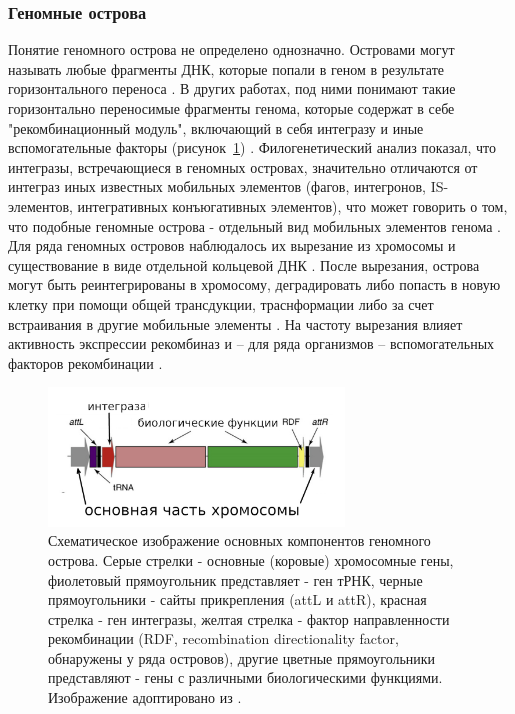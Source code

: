 


\subsubsection{Геномные острова}
Понятие геномного острова не определено однозначно. Островами могут называть любые фрагменты ДНК, которые попали в геном в результате горизонтального переноса \cite{langille2010detecting, bazin2020panrgp}. В других работах, под ними понимают такие горизонтально переносимые фрагменты генома, которые содержат в себе "рекомбинационный модуль", включающий в себя интегразу и иные вспомогательные факторы (рисунок~\ref{img:gi}) \cite{boyd2009genomic}. Филогенетический анализ показал, что интегразы, встречающиеся в геномных островах, значительно отличаются от интеграз иных известных мобильных элементов (фагов, интегронов, IS-элементов, интегративных конъюгативных элементов), что может говорить о том, что подобные геномные острова - отдельный вид мобильных элементов генома \cite{boyd2009genomic}. Для ряда геномных островов наблюдалось их вырезание из хромосомы и существование в виде отдельной кольцевой ДНК \cite{blum1994excision, rajanna2003vibrio}. После вырезания, острова могут быть реинтегрированы в хромосому, деградировать либо попасть в новую клетку при помощи общей трансдукции, траснформации либо за счет встраивания в другие мобильные элементы \cite{carpenter2016pathogenicity, pant2020molecular, boyd2009genomic}. На частоту вырезания влияет активность экспрессии рекомбиназ и -- для ряда организмов -- вспомогательных факторов рекомбинации \cite{pant2020molecular}.

\begin{figure}[!ht] 
  \center
  \includegraphics [width=0.7\textwidth] {Dissertation/images/lit/gi.jpg}
  \caption{Схематическое изображение основных компонентов геномного острова. Серые стрелки - основные (коровые) хромосомные гены, фиолетовый прямоугольник представляет - ген тРНК, черные прямоугольники - сайты прикрепления (attL и attR), красная стрелка - ген интегразы, желтая стрелка - фактор направленности рекомбинации (RDF, recombination directionality factor, обнаружены у ряда островов), другие цветные прямоугольники представляют - гены с различными биологическими функциями. Изображение адоптировано из \cite{boyd2009genomic}.} 
  \label{img:gi}  
\end{figure}


